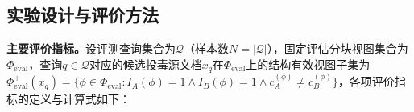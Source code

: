 \subsection{实验设计与评价方法}


\textbf{主要评价指标。}设评测查询集合为$\mathcal Q$（样本数$N=|\mathcal Q|$），固定评估分块视图集合为$\Phi_{\mathrm{eval}}$，查询$q\in\mathcal Q$对应的候选投毒源文档$x_q$在$\Phi_{\mathrm{eval}}$上的结构有效视图子集为$\Phi_{\mathrm{eval}}^+(x_q)=\{\phi\in\Phi_{\mathrm{eval}}:I_A(\phi)=1\land I_B(\phi)=1\land c_A^{(\phi)}\neq c_B^{(\phi)}\}$，各项评价指标的定义与计算式如下：
